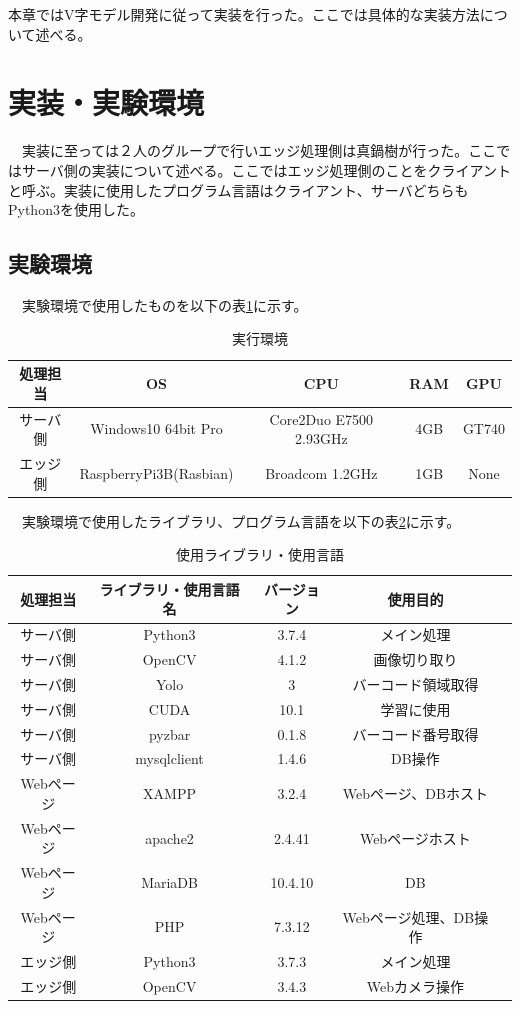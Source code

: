 本章ではV字モデル開発に従って実装を行った。ここでは具体的な実装方法について述べる。
\section{実装・実験環境}
　実装に至っては２人のグループで行いエッジ処理側は真鍋樹が行った。ここではサーバ側の実装について述べる。ここではエッジ処理側のことをクライアントと呼ぶ。実装に使用したプログラム言語はクライアント、サーバどちらもPython3を使用した。


\subsection*{実験環境}
　実験環境で使用したものを以下の表\ref{spec}に示す。
\begin{table}[htb]
\begin{center}
\caption{実行環境}
\begin{tabular}{|c|c|c|c|c|} \hline
処理担当 & OS & CPU & RAM & GPU \\ \hline
サーバ側 & Windows10 64bit Pro & Core2Duo E7500 2.93GHz & 4GB & GT740 \\ \hline
エッジ側 & RaspberryPi3B(Rasbian) & Broadcom 1.2GHz & 1GB & None \\ \hline
\end{tabular}
\label{spec}
	\end{center}
\end{table}


　実験環境で使用したライブラリ、プログラム言語を以下の表\ref{library_spec}に示す。
\begin{table}[htb]
\begin{center}
\caption{使用ライブラリ・使用言語}
\begin{tabular}{|c|c|c|c|c|} \hline
処理担当 & ライブラリ・使用言語名 & バージョン & 使用目的 \\ \hline \hline
サーバ側 & Python3 & 3.7.4 & メイン処理	\\ \hline
サーバ側 & OpenCV & 4.1.2 & 画像切り取り\\ \hline
サーバ側 & Yolo & 3 & バーコード領域取得\\ \hline
サーバ側 & CUDA & 10.1 & 学習に使用\\ \hline
サーバ側 & pyzbar & 0.1.8 & バーコード番号取得\\ \hline
サーバ側 & mysqlclient & 1.4.6 & DB操作\\ \hline \hline
Webページ & XAMPP & 3.2.4 & Webページ、DBホスト\\ \hline
Webページ & apache2 & 2.4.41 & Webページホスト\\ \hline
Webページ & MariaDB & 10.4.10 & DB\\ \hline
Webページ & PHP & 7.3.12 & Webページ処理、DB操作\\ \hline \hline
エッジ側 & Python3 & 3.7.3 & メイン処理		\\ \hline
エッジ側 & OpenCV & 3.4.3 & Webカメラ操作\\ \hline
\end{tabular}
\label{library_spec}
	\end{center}
\end{table}


